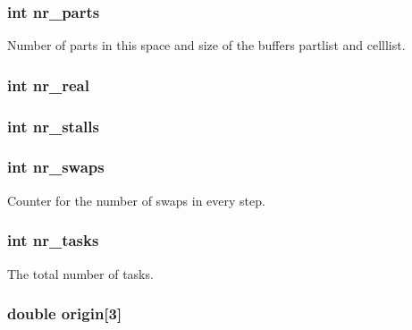 \hypertarget{structspace_ac4dd7e5fa976280ea5c88ef8206c2d5b}{
\subsubsection[{nr\-\_\-parts}]{\setlength{\rightskip}{0pt plus 5cm}int nr\-\_\-parts}}\label{structspace_ac4dd7e5fa976280ea5c88ef8206c2d5b}
Number of parts in this space and size of the buffers partlist and celllist. \hypertarget{structspace_a8b23aef7c564942ddcb33255a09a6cf9}{
\subsubsection[{nr\-\_\-real}]{\setlength{\rightskip}{0pt plus 5cm}int nr\-\_\-real}}\label{structspace_a8b23aef7c564942ddcb33255a09a6cf9}
\hypertarget{structspace_a2dbcd77d069cc25923e3c909b0c2d978}{
\subsubsection[{nr\-\_\-stalls}]{\setlength{\rightskip}{0pt plus 5cm}int nr\-\_\-stalls}}\label{structspace_a2dbcd77d069cc25923e3c909b0c2d978}
\hypertarget{structspace_a5152553ed5afee9e5396a8263b0e3600}{
\subsubsection[{nr\-\_\-swaps}]{\setlength{\rightskip}{0pt plus 5cm}int nr\-\_\-swaps}}\label{structspace_a5152553ed5afee9e5396a8263b0e3600}
Counter for the number of swaps in every step. \hypertarget{structspace_a02f48908e70244064a7b68a055b9ae2c}{
\subsubsection[{nr\-\_\-tasks}]{\setlength{\rightskip}{0pt plus 5cm}int nr\-\_\-tasks}}\label{structspace_a02f48908e70244064a7b68a055b9ae2c}
The total number of tasks. \hypertarget{structspace_a61c2e65573374fec6a4c402febbade84}{
\subsubsection[{origin}]{\setlength{\rightskip}{0pt plus 5cm}double origin\mbox{[}3\mbox{]}}}\label{structspace_a61c2e65573374fec6a4c402febbade84}
